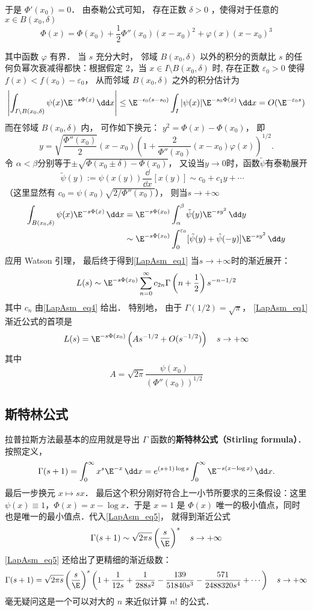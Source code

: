 于是 $\Phi'(x_0)=0$． 由泰勒公式可知， 存在正数 $\delta>0$ ，使得对于任意的 $x\in B(x_0,\delta)$  
\[
  \Phi(x)=\Phi(x_0)+\frac{1}{2}\Phi''(x_0)(x-x_0)^2+\varphi(x)(x-x_0)^3
\]

其中函数 $\varphi$ 有界． 当 $s$ 充分大时， 邻域 $B(x_0,\delta)$ 以外的积分的贡献比 $s$ 的任何负幂次衰减得都快：根据假定 2，当 $x\in I\setminus B(x_0,\delta)$ 时, 存在正数 $\varepsilon_0>0$ 使得 $f(x)<f(x_0)-\varepsilon_0$， 从而邻域 $B(x_0,\delta)$ 之外的积分估计为
\[
  \left|\int_{I\setminus B(x_0,\delta)}\psi(x)\E^{-s\Phi(x)}\,\dd x\right|
  \leq \E^{-\epsilon_0(s-s_0)}\int_I|\psi(x)|\E^{-s_0\Phi(x)}\,\dd x
  =O(\E^{-\varepsilon_0s})
\]
而在邻域 $B(x_0,\delta)$ 内， 可作如下换元： $y^2=\Phi(x)-\Phi(x_0)$， 即
\[
  y=\sqrt{\frac{\Phi''(x_0)}{2}}(x-x_0)\left(1+\frac{2}{\Phi''(x_0)}(x-x_0)\varphi(x)\right)^{1/2}.
\]
令 $\alpha<\beta$分别等于$\pm\sqrt{\Phi(x_0\pm\delta)-\Phi(x_0)}$， 又设当$y\to0$时，函数$\tilde{\psi}$有泰勒展开
\begin{equation}\label{LapAsm_eq4}
\tilde{\psi}(y):=\psi(x(y))\frac{\dd}{\dd x}[x(y)]\sim c_0+c_1y+\cdots \quad 
\end{equation}
（这里显然有 $c_0=\psi(x_0)\sqrt{2/\Phi''(x_0)}$）， 则当$s\to+\infty$
$$
\begin{aligned}
\int_{B(x_0,\delta)}\psi(x)\E^{-s\Phi(x)}\,\dd x
&=\E^{-s\Phi(x_0)}\int_{\alpha}^{\beta}\tilde \psi(y)\E^{-sy^2}\,\dd y\\
&\sim\E^{-s\Phi(x_0)}\int_{0}^{\varepsilon_0}[\tilde \psi(y)+\tilde \psi(-y)]\E^{-sy^2}\,\dd y
\end{aligned}
$$
应用 Watson 引理， 最后终于得到\autoref{LapAsm_eq1} 当$s\to+\infty$时的渐近展开：
\begin{equation}\label{LapAsm_eq5}
  L(s)\sim \E^{-s\Phi(x_0)}\sum_{n=0}^\infty c_{2n}\Gamma\left(n+\frac{1}{2}\right)s^{-n-1/2}
\end{equation}
其中 $c_n$ 由\autoref{LapAsm_eq4} 给出． 特别地， 由于 $\Gamma(1/2)=\sqrt{\pi}$， \autoref{LapAsm_eq1} 渐近公式的首项是
\[
L(s)=\E^{-s\Phi(x_0)}\left(As^{-1/2}+O(s^{-1/2})\right)\quad s\to+\infty
\]
其中
\[
  A=\sqrt{2\pi}\frac{\psi(x_0)}{(\Phi''(x_0))^{1/2}}
\]

\subsection{斯特林公式}
拉普拉斯方法最基本的应用就是导出 $\Gamma$ 函数的\textbf{斯特林公式（Stirling formula）}． 按照定义，
\[
  \Gamma(s+1)
  =\int_0^\infty x^s\E^{-x}\,\dd x
  =e^{(s+1)\log s}\int_0^\infty \E^{-s(x-\log x)}\,\dd x.
\]
最后一步换元 $x\mapsto sx$． 最后这个积分刚好符合上一小节所要求的三条假设：这里 $\psi(x)\equiv1$，$\Phi(x)=x-\log x$．于是 $x=1$ 是 $\Phi(x)$ 唯一的极小值点，同时也是唯一的最小值点．代入\autoref{LapAsm_eq5}， 就得到渐近公式
\[
  \Gamma(s+1)\sim\sqrt{2\pi s}\left(\frac{s}{\E}\right)^s\quad s\to+\infty
\]
\autoref{LapAsm_eq5} 还给出了更精细的渐近级数：
\[
  \Gamma(s+1)
  =\sqrt{2\pi s}\left({s\over \E}\right)^s
  \left(
   1
   +{1\over12s}
   +{1\over288 s^2}
   -{139\over51840 s^3}
   -{571\over2488320 s^4}
   + \cdots
  \right)\quad s\to+\infty
\]
毫无疑问这是一个可以对大的 $n$ 来近似计算 $n!$ 的公式．
